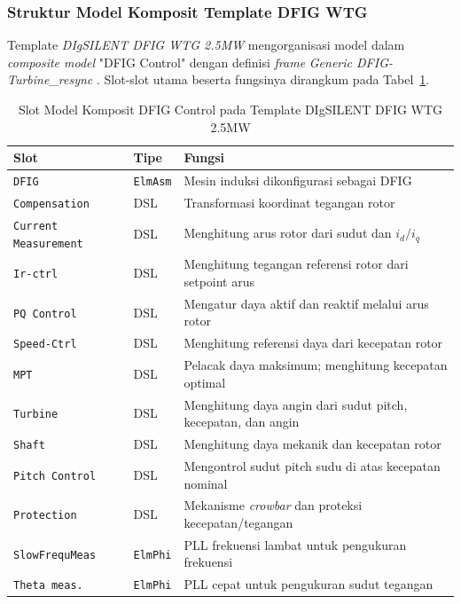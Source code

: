 \subsubsection{Struktur Model Komposit Template DFIG WTG}

Template \textit{DIgSILENT DFIG WTG 2.5MW} mengorganisasi model dalam
\textit{composite model} "DFIG Control" dengan definisi \textit{frame}
\textit{Generic DFIG-Turbine\_resync} \cite{digsilent2024dfig}. Slot-slot utama
beserta fungsinya dirangkum pada Tabel~\ref{tab:dfig-template-slots}.

\begin{table}[H]
\centering
\caption[Slot Model Komposit DFIG Control pada Template DIgSILENT DFIG WTG 2.5MW]{Slot Model Komposit DFIG Control pada Template DIgSILENT DFIG WTG 2.5MW
\cite{digsilent2024dfig}}
\label{tab:dfig-template-slots}
\small
\begin{tabular}{p{3.8cm} p{1.6cm} p{7.8cm}}
\toprule
\textbf{Slot} & \textbf{Tipe} & \textbf{Fungsi} \\
\midrule
\texttt{DFIG} & \texttt{ElmAsm} & Mesin induksi dikonfigurasi sebagai DFIG \\
\texttt{Compensation} & DSL & Transformasi koordinat tegangan rotor \\
\texttt{Current Measurement} & DSL & Menghitung arus rotor dari sudut dan $i_d/i_q$ \\
\texttt{Ir-ctrl} & DSL & Menghitung tegangan referensi rotor dari setpoint arus \\
\texttt{PQ Control} & DSL & Mengatur daya aktif dan reaktif melalui arus rotor \\
\texttt{Speed-Ctrl} & DSL & Menghitung referensi daya dari kecepatan rotor \\
\texttt{MPT} & DSL & Pelacak daya maksimum; menghitung kecepatan optimal \\
\texttt{Turbine} & DSL & Menghitung daya angin dari sudut pitch, kecepatan, dan angin \\
\texttt{Shaft} & DSL & Menghitung daya mekanik dan kecepatan rotor \\
\texttt{Pitch Control} & DSL & Mengontrol sudut pitch sudu di atas kecepatan nominal \\
\texttt{Protection} & DSL & Mekanisme \textit{crowbar} dan proteksi kecepatan/tegangan \\
\texttt{SlowFrequMeas} & \texttt{ElmPhi} & PLL frekuensi lambat untuk pengukuran frekuensi \\
\texttt{Theta meas.} & \texttt{ElmPhi} & PLL cepat untuk pengukuran sudut tegangan \\
\bottomrule
\end{tabular}
\end{table}

